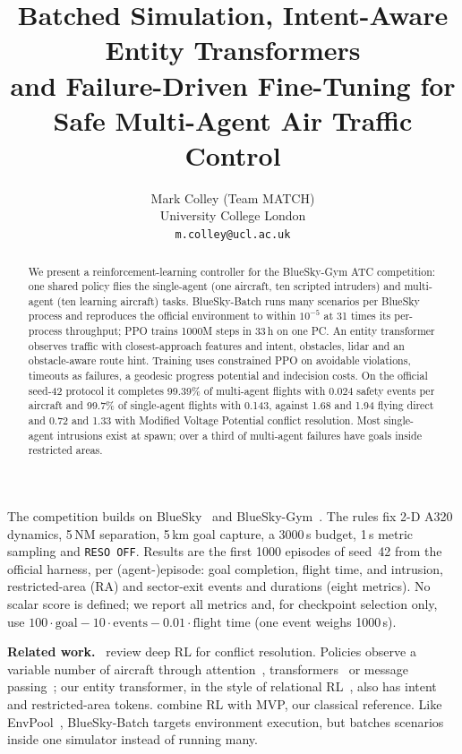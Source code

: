 \documentclass[10pt,twocolumn]{article}
\title{\vspace{-8mm}Batched Simulation, Intent-Aware Entity Transformers\\
and Failure-Driven Fine-Tuning for Safe Multi-Agent Air Traffic Control\vspace{-1mm}}
\author{Mark Colley (Team MATCH)\\ University College London\\ \small\texttt{m.colley@ucl.ac.uk}\vspace{-3mm}}
\date{}
\makeatletter
\renewcommand\section{\@startsection{section}{1}{\z@}{-2ex plus -.5ex minus -.2ex}{1ex plus .2ex}{\normalfont\large\bfseries}}
\newcommand{\BSB}{BlueSky-Batch\xspace}
\renewcommand{\paragraph}[1]{\par\smallskip\noindent\textbf{#1}\ }
\makeatother
\begin{document}
\maketitle

\begin{abstract}
\noindent
We present a reinforcement-learning controller for the BlueSky-Gym ATC
competition: one shared policy flies the single-agent (one aircraft, ten scripted
intruders) and multi-agent (ten learning aircraft) tasks. \BSB
runs many scenarios per BlueSky process and reproduces the official
environment to within $10^{-5}$ at 31 times its per-process throughput; PPO
trains 1000M steps in 33\,h on one PC. An entity transformer observes traffic with
closest-approach features and intent, obstacles, lidar and an obstacle-aware
route hint. Training uses constrained PPO on avoidable
violations, timeouts as failures, a geodesic progress potential and indecision
costs. On the official seed-42 protocol it completes 99.39\% of
multi-agent flights with 0.024 safety events per aircraft and 99.7\% of
single-agent flights with 0.143, against 1.68 and 1.94 flying direct and 0.72
and 1.33 with Modified Voltage Potential conflict resolution. Most single-agent
intrusions exist at spawn; over a third of multi-agent failures have goals
inside restricted areas.
\end{abstract}

\section{Problem}
The competition builds on BlueSky~\citep{hoekstra2016bluesky} and
BlueSky-Gym~\citep{groot2024blueskygym}.
The rules fix 2-D A320 dynamics, 5\,NM separation, 5\,km goal
capture, a 3000\,s budget, 1\,s metric sampling and \texttt{RESO OFF}.
Results are the first 1000 episodes of seed~42 from the official harness, per
(agent-)episode: goal completion, flight time, and intrusion, restricted-area
(RA) and sector-exit events and durations (eight metrics). No scalar score is defined; we
report all metrics and, for checkpoint selection only, use
$100\cdot\text{goal} - 10\cdot\text{events} - 0.01\cdot\text{flight time}$
(one event weighs 1000\,s).

\paragraph{Related work.} \citet{wang2022review} review deep RL for conflict
resolution. Policies observe a variable number of aircraft through
attention~\citep{brittain2024attention}, transformers~\citep{aziz2026transformer}
or message passing~\citep{dalmau2020mpnn}; our entity transformer, in the style
of relational RL~\citep{zambaldi2019relational}, also has intent and
restricted-area tokens. \citet{ribeiro2020mvp} combine RL with MVP, our
classical reference. Like EnvPool~\citep{weng2022envpool}, \BSB targets
environment execution, but batches scenarios inside one simulator instead of
running many.
\end{document}

